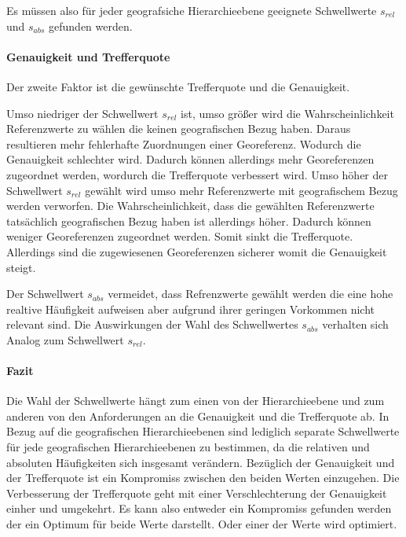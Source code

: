 					Es müssen also für jeder geografsiche Hierarchieebene geeignete Schwellwerte $s_{rel}$ und $s_{abs}$ gefunden werden.

				\paragraph{Genauigkeit und Trefferquote} 

					Der zweite Faktor ist die gewünschte Trefferquote und die Genauigkeit.

					Umso niedriger der Schwellwert $s_{rel}$ ist, umso größer wird die Wahrscheinlichkeit Referenzwerte zu wählen die keinen geografischen Bezug haben.
					Daraus resultieren mehr fehlerhafte Zuordnungen einer Georeferenz.
					Wodurch die Genauigkeit schlechter wird.
					Dadurch können allerdings mehr Georeferenzen zugeordnet werden, wordurch die Trefferquote verbessert wird.
					Umso höher der Schwellwert $s_{rel}$ gewählt wird umso mehr Referenzwerte mit geografischem Bezug werden verworfen.
					Die Wahrscheinlichkeit, dass die gewählten Referenzwerte tatsächlich geografischen Bezug haben ist allerdings höher.
					Dadurch können weniger Georeferenzen zugeordnet werden.
					Somit sinkt die Trefferquote.
					Allerdings sind die zugewiesenen Georeferenzen sicherer womit die Genauigkeit steigt.

					Der Schwellwert $s_{abs}$ vermeidet, dass Refrenzwerte gewählt werden die eine hohe realtive Häufigkeit aufweisen aber aufgrund ihrer geringen Vorkommen nicht relevant sind.
					Die Auswirkungen der Wahl des Schwellwertes $s_{abs}$ verhalten sich Analog zum Schwellwert $s_{rel}$.

				\paragraph{Fazit}

					Die Wahl der Schwellwerte hängt zum einen von der Hierarchieebene und zum anderen von den Anforderungen an die Genauigkeit und die Trefferquote ab.
					In Bezug auf die geografischen Hierarchieebenen sind lediglich separate Schwellwerte für jede geografischen Hierarchieebenen zu bestimmen, da die relativen und absoluten Häufigkeiten sich insgesamt verändern.
					Bezüglich der Genauigkeit und der Trefferquote ist ein Kompromiss zwischen den beiden Werten einzugehen. 
					Die Verbesserung der Trefferquote geht mit einer Verschlechterung der Genauigkeit einher und umgekehrt.
					Es kann also entweder ein Kompromiss gefunden werden der ein Optimum für beide Werte darstellt. 
					Oder einer der Werte wird optimiert. 
			
		



	